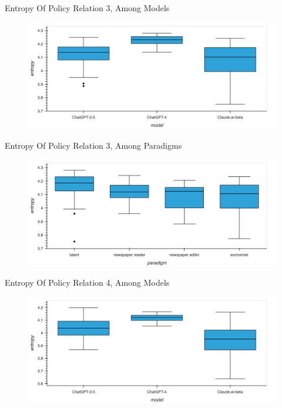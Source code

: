 \documentclass[12pt]{beamer}
\begin{document}
\begin{frame}{Entropy Of Policy Relation 3, Among Models}
\begin{figure}[H]
\centering
\includegraphics[width=11.5cm]{Figures/fig19.png}
\end{figure}
\end{frame}


\begin{frame}{Entropy Of Policy Relation 3, Among Paradigms}
\begin{figure}[H]
\centering
\includegraphics[width=11.5cm]{Figures/fig20.png}
\end{figure}
\end{frame}


\begin{frame}{Entropy Of Policy Relation 4, Among Models}
\begin{figure}[H]
\centering
\includegraphics[width=11.5cm]{Figures/fig21.png}
\end{figure}
\end{frame}
\end{document}
